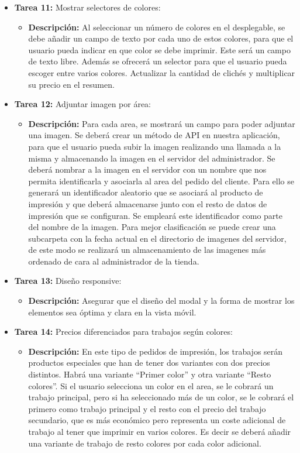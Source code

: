 \documentclass[12pt]{article}
\begin{document}
\begin{itemize}
    \item \textbf{Tarea 11:} Mostrar selectores de colores:
          \begin{itemize}[label=--]
              \item \textbf{Descripción:} Al seleccionar un número de colores en el desplegable, se debe añadir un campo de texto por cada uno de estos colores, para que el usuario pueda indicar en que color se debe imprimir. Este será un campo de texto libre. Además se ofrecerá un selector para que el usuario pueda escoger entre varios colores. Actualizar la cantidad de clichés y multiplicar su precio en el resumen.
          \end{itemize}
    \item \textbf{Tarea 12:} Adjuntar imagen por área:
          \begin{itemize}[label=--]
              \item \textbf{Descripción:} Para cada area, se mostrará un campo para poder adjuntar una imagen. Se deberá crear un método de API en nuestra aplicación, para que el usuario pueda subir la imagen realizando una llamada a la misma y almacenando la imagen en el servidor del administrador. Se deberá nombrar a la imagen en el servidor con un nombre que nos permita identificarla y asociarla al area del pedido del cliente. Para ello se generará un identificador aleatorio que se asociará al producto de impresión y que deberá almacenarse junto con el resto de datos de impresión que se configuran. Se empleará este identificador como parte del nombre de la imagen. Para mejor clasificación se puede crear una subcarpeta con la fecha actual en el directorio de imagenes del servidor, de este modo se realizará un almacenamiento de las imagenes más ordenado de cara al administrador de la tienda.
          \end{itemize}
    \item \textbf{Tarea 13:} Diseño responsive:
          \begin{itemize}[label=--]
              \item \textbf{Descripción:} Asegurar que el diseño del modal y la forma de mostrar los elementos sea óptima y clara en la vista móvil.
          \end{itemize}
    \item \textbf{Tarea 14:} Precios diferenciados para trabajos según colores:
          \begin{itemize}[label=--]
              \item \textbf{Descripción:} En este tipo de pedidos de impresión, los trabajos serán productos especiales que han de tener dos variantes con dos precios distintos. Habrá una variante ``Primer color'' y otra variante ``Resto colores''. Si el usuario selecciona un color en el area, se le cobrará un trabajo principal, pero si ha seleccionado más de un color, se le cobrará el primero como trabajo principal y el resto con el precio del trabajo secundario, que es más económico pero representa un coste adicional de trabajo al tener que imprimir en varios colores. Es decir se deberá añadir una variante de trabajo de resto colores por cada color adicional.
          \end{itemize}
\end{itemize}
\end{document}
